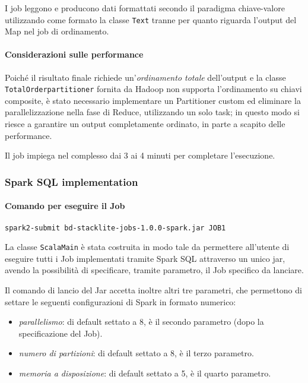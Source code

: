   I job leggono e producono dati formattati secondo il paradigma chiave-valore utilizzando come formato la classe \texttt{Text} tranne per quanto riguarda l'output del Map nel job di ordinamento.

  \paragraph{Considerazioni sulle performance}\label{par:job1:mapreduce:performance}

  Poiché il risultato finale richiede un'\textit{ordinamento totale} dell'output e la classe \texttt{TotalOrderpartitioner} fornita da Hadoop non supporta l'ordinamento su chiavi composite,
  è stato necessario implementare un Partitioner custom ed eliminare la parallelizzazione nella fase di Reduce, utilizzando un solo task;
  in questo modo si riesce a garantire un output completamente ordinato, in parte a scapito delle performance.

  Il job impiega nel complesso dai 3 ai 4 minuti per completare l'esecuzione.

  \subsubsection{Spark SQL implementation}\label{subsub:job1:spark}

  \paragraph{Comando per eseguire il Job}\label{par:job1:spark:cmd}

  \texttt{spark2-submit bd-stacklite-jobs-1.0.0-spark.jar JOB1}

  La classe \texttt{ScalaMain} è stata costruita in modo tale da permettere all'utente di eseguire tutti i Job implementati tramite
  Spark SQL attraverso un unico jar, avendo la possibilità di specificare, tramite parametro, il Job specifico da lanciare.

  Il comando di lancio del Jar accetta inoltre altri tre parametri, che permettono di settare le seguenti configurazioni di Spark in formato numerico:
  \begin{itemize}
    \item \textit{parallelismo}: di default settato a 8, è il secondo parametro (dopo la specificazione del Job).
    \item \textit{numero di partizioni}: di default settato a 8, è il terzo parametro.
    \item \textit{memoria a disposizione}: di default settato a 5, è il quarto parametro.
  \end{itemize}

